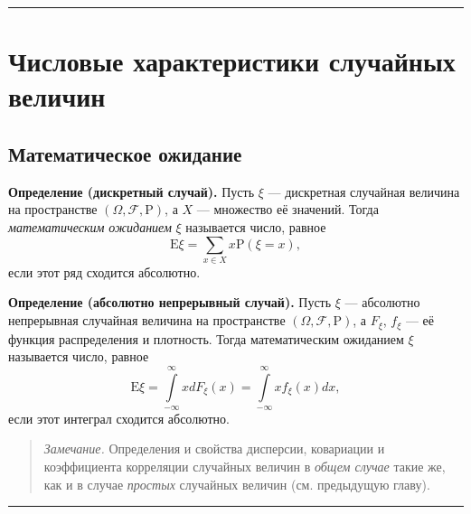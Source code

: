 \documentclass[11pt,a4paper]{article}
\renewcommand{\linethickness}{0.1ex}
\begin{document}
    \begin{center}\rule{0.5\linewidth}{\linethickness}\end{center}

    \hypertarget{ux447ux438ux441ux43bux43eux432ux44bux435-ux445ux430ux440ux430ux43aux442ux435ux440ux438ux441ux442ux438ux43aux438-ux441ux43bux443ux447ux430ux439ux43dux44bux445-ux432ux435ux43bux438ux447ux438ux43d}{%
\section{Числовые характеристики случайных
величин}\label{ux447ux438ux441ux43bux43eux432ux44bux435-ux445ux430ux440ux430ux43aux442ux435ux440ux438ux441ux442ux438ux43aux438-ux441ux43bux443ux447ux430ux439ux43dux44bux445-ux432ux435ux43bux438ux447ux438ux43d}}

\hypertarget{ux43cux430ux442ux435ux43cux430ux442ux438ux447ux435ux441ux43aux43eux435-ux43eux436ux438ux434ux430ux43dux438ux435}{%
\subsection{Математическое
ожидание}\label{ux43cux430ux442ux435ux43cux430ux442ux438ux447ux435ux441ux43aux43eux435-ux43eux436ux438ux434ux430ux43dux438ux435}}

\textbf{Определение (дискретный случай).} Пусть \(\xi\) --- дискретная
случайная величина на пространстве
\((\Omega, \mathcal{F}, \mathrm{P})\), а \(X\) --- множество её
значений. Тогда \emph{математическим ожиданием} \(\xi\) называется
число, равное
\[ \mathrm{E}\xi = \sum\limits_{x \in X}x\mathrm{P}(\xi = x), \] если
этот ряд сходится абсолютно.

\textbf{Определение (абсолютно непрерывный случай).} Пусть \(\xi\) ---
абсолютно непрерывная случайная величина на пространстве
\((\Omega, \mathcal{F}, \mathrm{P})\), а \(F_\xi\), \(f_\xi\) --- её
функция распределения и плотность. Тогда математическим ожиданием
\(\xi\) называется число, равное
\[ \mathrm{E}\xi = \int\limits_{-\infty}^{\infty} xdF_\xi(x) = \int\limits_{-\infty}^{\infty} xf_\xi(x)dx, \]
если этот интеграл сходится абсолютно.

\begin{quote}
\emph{Замечание.} Определения и свойства дисперсии, ковариации и
коэффициента корреляции случайных величин в \emph{общем случае} такие
же, как и в случае \emph{простых} случайных величин (см. предыдущую
главу).
\end{quote}

    \begin{center}\rule{0.5\linewidth}{\linethickness}\end{center}
\end{document}

